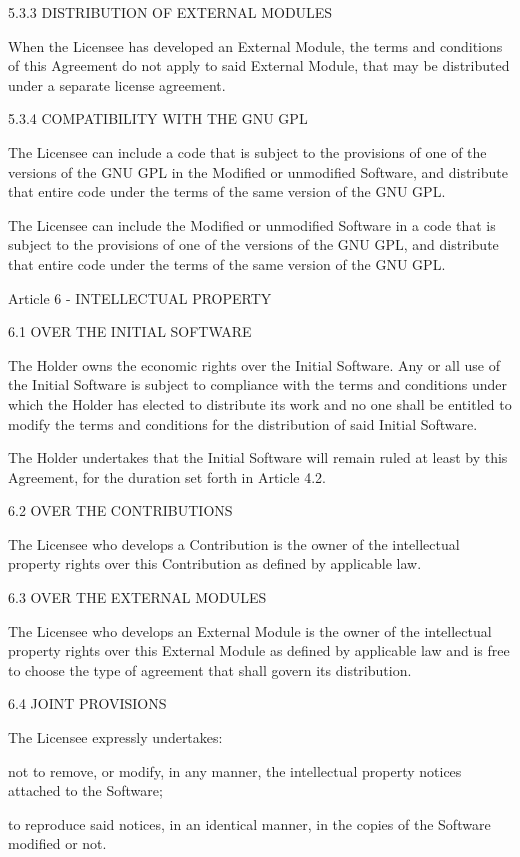 \documentclass[oneside,english,onecolumn,letterpaper]{book}
\begin{document}
5.3.3 DISTRIBUTION OF EXTERNAL MODULES

When the Licensee has developed an External Module, the terms and conditions of this Agreement do not apply to said External Module, that may be distributed under a separate license agreement.

5.3.4 COMPATIBILITY WITH THE GNU GPL

The Licensee can include a code that is subject to the provisions of one of the versions of the GNU GPL in the Modified or unmodified Software, and distribute that entire code under the terms of the same version of the GNU GPL.

The Licensee can include the Modified or unmodified Software in a code that is subject to the provisions of one of the versions of the GNU GPL, and distribute that entire code under the terms of the same version of the GNU GPL.

Article 6 - INTELLECTUAL PROPERTY

6.1 OVER THE INITIAL SOFTWARE

The Holder owns the economic rights over the Initial Software. Any or all use of the Initial Software is subject to compliance with the terms and conditions under which the Holder has elected to distribute its work and no one shall be entitled to modify the terms and conditions for the distribution of said Initial Software.

The Holder undertakes that the Initial Software will remain ruled at least by this Agreement, for the duration set forth in Article 4.2.

6.2 OVER THE CONTRIBUTIONS

The Licensee who develops a Contribution is the owner of the intellectual property rights over this Contribution as defined by applicable law.

6.3 OVER THE EXTERNAL MODULES

The Licensee who develops an External Module is the owner of the intellectual property rights over this External Module as defined by applicable law and is free to choose the type of agreement that shall govern its distribution.

6.4 JOINT PROVISIONS

The Licensee expressly undertakes:

not to remove, or modify, in any manner, the intellectual property notices attached to the Software;

to reproduce said notices, in an identical manner, in the copies of the Software modified or not.
\end{document}

